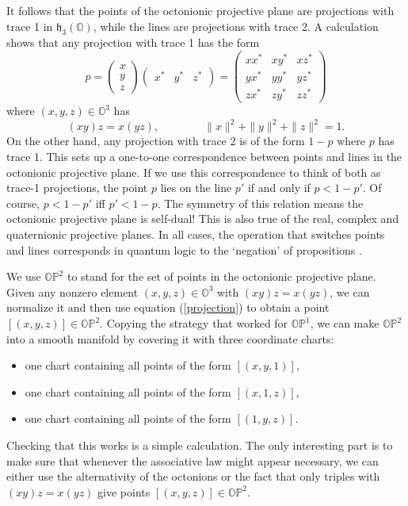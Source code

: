 \documentclass[12pt]{article}
\renewcommand\O{{\mathbb O}}
\newcommand\OP{{\mathbb {OP}}}
\newcommand{\h}{{\mathfrak {h}}}
\newcommand{\be}{\begin{equation}}
\newcommand{\ee}{\end{equation}}
\begin{document}
It follows that the points of the octonionic projective plane are 
projections with trace 1 in $\h_3(\O)$, while the lines are projections 
with trace 2.  A calculation \cite{Harvey} shows that any projection 
with trace 1 has the form 
\be   p =  
\left( \begin{array}{c}  x \\ y \\ z \end{array} \right)  
\left( \begin{array}{ccc} \! x^\ast  &  y^\ast & z^\ast \! \end{array} \right)  
=  
\left( \begin{array}{ccc}  
                         x x^*  & x y^*   & x z^* \\ 
                         y x^*  & y y^*   & y z^* \\ 
                         z x^*  & z y^*   & z z^*  
\end{array} \right)   
\label{projection} 
\ee 
where $(x,y,z) \in \O^3$ has 
\[     (xy)z = x(yz), \qquad \qquad  \|x\|^2 + \|y\|^2 + \|z\|^2 = 1 .\] 
On the other hand, any projection with trace 2 is of the form $1 - p$ 
where $p$ has trace 1.  This sets up a one-to-one correspondence between 
points and lines in the octonionic projective plane.  If we use this 
correspondence to think of both as trace-1 projections, the point $p$ 
lies on the line $p'$ if and only if $p < 1 - p'$.  Of course, $p < 1 - p'$ 
iff $p' < 1 - p$.   The symmetry of this relation means the octonionic 
projective plane is self-dual!  This is also true of the real, complex 
and quaternionic projective planes.  In all cases, the operation that 
switches points and lines corresponds in quantum logic to the `negation'
of propositions \cite{Varadarajan}.

We use $\OP^2$ to stand for the set of points in the octonionic 
projective plane.   Given any nonzero element $(x,y,z) \in \O^3$ with 
$(xy)z = x(yz)$, we can normalize it and then use equation 
(\ref{projection}) to obtain a point $[(x,y,z)] \in \OP^2$.  Copying the 
strategy that worked for $\OP^1$, we can make $\OP^2$ into a smooth manifold  
by covering it with three coordinate charts:
\begin{itemize}
\item one chart containing all points of the form $[(x,y,1)]$, 
\item one chart containing all points of the form $[(x,1,z)]$, 
\item one chart containing all points of the form $[(1,y,z)]$. 
\end{itemize}
Checking that this works is a simple calculation.  The only interesting
part is to make sure that whenever the associative law might appear
necessary, we can either use the alternativity of the octonions or the
fact that only triples with $(xy)z = x(yz)$ give points $[(x,y,z)] \in
\OP^2$.
 
\end{document}
